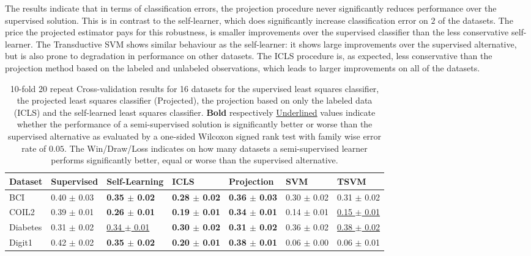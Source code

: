 \documentclass[sts,preprint]{imsart-custom}
\begin{document}
The results indicate that in terms of classification errors, the projection procedure never significantly reduces performance over the supervised solution. This is in contrast to the self-learner, which does significantly increase classification error on $2$ of the datasets. The price the projected estimator pays for this robustness, is smaller improvements over the supervised classifier than the less conservative self-learner. The Transductive SVM shows similar behaviour as the self-learner: it shows large improvements over the supervised alternative, but is also prone to degradation in performance on other datasets. The ICLS procedure is, as expected, less conservative than the projection method based on the labeled and unlabeled observations, which leads to larger improvements on all of the datasets.

\begin{table*}[t]
\center
\caption{10-fold 20 repeat Cross-validation results for 16 datasets for the supervised least squares classifier, the projected least squares classifier (Projected), the projection based on only the labeled data (ICLS) and the self-learned least squares classifier. \textbf{Bold} respectively \underline{Underlined} values indicate whether the performance of a semi-supervised solution is significantly better or worse than the supervised alternative as evaluated by a one-sided Wilcoxon signed rank test with family wise error rate of $0.05$. The Win/Draw/Loss indicates on how many datasets a semi-supervised learner performs significantly better, equal or worse than the supervised alternative.}
\smallskip
\smallskip
\smallskip
\begin{tabular}{|l|llll|ll|}
   \hline
Dataset & Supervised & Self-Learning & ICLS & Projection & SVM & TSVM \\ 
  \hline
BCI & 0.40 $\pm$ 0.03 & \textbf{0.35 $\pm$ 0.02} & \textbf{0.28 $\pm$ 0.02} & \textbf{0.36 $\pm$ 0.03} & 0.30 $\pm$ 0.02 & 0.31 $\pm$ 0.02 \\ 
  COIL2 & 0.39 $\pm$ 0.01 & \textbf{0.26 $\pm$ 0.01} & \textbf{0.19 $\pm$ 0.01} & \textbf{0.34 $\pm$ 0.01} & 0.14 $\pm$ 0.01 & \underline{0.15 $\pm$ 0.01} \\ 
  Diabetes & 0.31 $\pm$ 0.02 & \underline{0.34 $\pm$ 0.01} & \textbf{0.30 $\pm$ 0.02} & \textbf{0.31 $\pm$ 0.02} & 0.36 $\pm$ 0.02 & \underline{0.38 $\pm$ 0.02} \\ 
  Digit1 & 0.42 $\pm$ 0.02 & \textbf{0.35 $\pm$ 0.02} & \textbf{0.20 $\pm$ 0.01} & \textbf{0.38 $\pm$ 0.01} & 0.06 $\pm$ 0.00 & 0.06 $\pm$ 0.01 \\ 

\end{tabular}
\end{table*}
\end{document}
